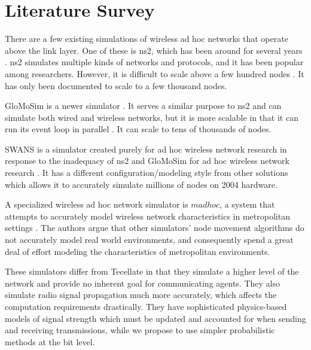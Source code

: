 \section{Literature Survey}

There are a few existing simulations of wireless ad hoc networks that operate above the link layer.
One of these is ns2, which has been around for several years \cite{ns2}. ns2 simulates multiple
kinds of networks and protocols, and it has been popular among researchers. However, it is difficult
to scale above a few hundred nodes \cite{swans}. It has only been documented to scale to a few
thousand nodes.

GloMoSim is a newer simulator \cite{glomosim}. It serves a similar purpose to ns2 and can simulate
both wired and wireless networks, but it is more scalable in that it can run its event loop in
parallel \cite{swans}. It can scale to tens of thousands of nodes.

SWANS is a simulator created purely for ad hoc wireless network research in response to the
inadequacy of ns2 and GloMoSim for ad hoc wireless network research \cite{swans}. It has a different
configuration/modeling style from other solutions which allows it to accurately simulate millions of
nodes on 2004 hardware.

A specialized wireless ad hoc network simulator is $madhoc$, a system that attempts to accurately
model wireless network characteristics in metropolitan settings \cite{madhoc}. The authors argue
that other simulators' node movement algorithms do not accurately model real world environments, and
consequently spend a great deal of effort modeling the characteristics of metropolitan environments.

These simulators differ from Tecellate in that they simulate a higher level of the network and
provide no inherent goal for communicating agents. They also simulate radio signal propagation much
more accurately, which affects the computation requirements drastically. They have sophisticated
physics-based models of signal strength which must be updated and accounted for when sending and
receiving transmissions, while we propose to use simpler probabilistic methods at the bit level.
